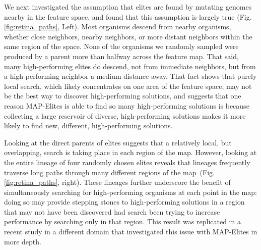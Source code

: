 \documentclass[twocolumn, DIV25, 9pt]{scrartcl}
\begin{document}
We next investigated the assumption that elites are found by mutating genomes nearby in the feature space, and found that this assumption is largely true  (Fig. \ref{fig:retina_paths}, Left). Most organisms descend from nearby organisms, whether close neighbors, nearby neighbors, or more distant neighbors within the same region of the space. None of the organisms we randomly sampled were produced by a parent more than halfway across the feature map. That said, many high-performing elites do descend, not from immediate neighbors, but from a high-performing neighbor a medium distance away. That fact shows that purely local search, which likely concentrates on one area of the feature space, may not be the best way to discover high-performing solutions, and suggests that one reason MAP-Elites is able to find so many high-performing solutions is because collecting a large reservoir of diverse, high-performing solutions makes it more likely to find new, different, high-performing solutions. 

Looking at the direct parents of elites suggests that a relatively local, but overlapping, search is taking place in each region of the map. However, looking at the entire lineage of four randomly chosen elites reveals that lineages frequently traverse long paths through many different regions of the map~(Fig. \ref{fig:retina_paths}, right). These lineages further underscore the benefit of simultaneously searching for high-performing organisms at each point in the map: doing so may provide stepping stones to high-performing solutions in a region that may not have been discovered had search been trying to increase performance by searching only in that region. This result was replicated in a recent study in a different domain that investigated this issue with MAP-Elites in more depth\cite{nguyen2015introducing}.
\end{document}
